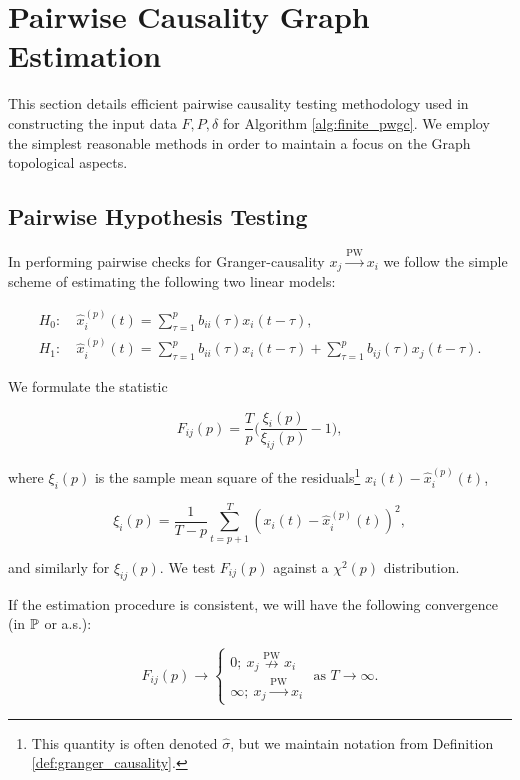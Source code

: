 \documentclass[12pt]{article}
\def\pwgc{\overset{\text{PW}}{\rightarrow}}  %
\def\npwgc{\overset{\text{PW}}{\nrightarrow}}  %
\begin{document}
\clearpage
\printbibliography
\clearpage
\appendix

\section{Pairwise Causality Graph Estimation}
This section details efficient pairwise causality testing methodology
used in constructing the input data $F, P, \delta$ for Algorithm
\ref{alg:finite_pwgc}.  We employ the simplest reasonable methods in
order to maintain a focus on the Graph topological aspects.

\subsection{Pairwise Hypothesis Testing}
\label{sec:pairwise_hypothesis_testing}
In performing pairwise checks for Granger-causality $x_j \pwgc x_i$ we
follow the simple scheme of estimating the following two linear models:

\begin{align}
  H_0:&\ \widehat{x}_i^{(p)}(t) = \sum_{\tau = 1}^{p} b_{ii}(\tau)x_i(t - \tau),\\
  H_1:&\ \widehat{x}_i^{(p)}(t) = \sum_{\tau = 1}^{p} b_{ii}(\tau)x_i(t - \tau) + \sum_{\tau = 1}^pb_{ij}(\tau)x_j(t - \tau).
\end{align}

We formulate the statistic 

\begin{equation}
  \label{eqn:gc_statistics}
  F_{ij}(p) = \frac{T}{p}\Big(\frac{\xi_i(p)}{\xi_{ij}(p)} - 1\Big),
\end{equation}

where $\xi_i(p)$ is the sample mean square of the
residuals\footnote{This quantity is often denoted $\widehat{\sigma}$,
  but we maintain notation from Definition
  \ref{def:granger_causality}.}  $x_i(t) - \widehat{x}^{(p)}_i(t)$,

\begin{equation*}
  \xi_i(p) = \frac{1}{T - p}\sum_{t = p + 1}^T (x_i(t) - \widehat{x}_i^{(p)}(t))^2,
\end{equation*}

and similarly for $\xi_{ij}(p)$.  We test $F_{ij}(p)$ against a
$\chi^2(p)$ distribution.

If the estimation procedure is consistent, we will have the following
convergence (in $\P$ or a.s.):

\begin{equation}
  F_{ij}(p) \rightarrow
  \left\{
    \begin{array}{ll}
      0;\ x_j \npwgc x_i\\
      \infty;\ x_j \pwgc x_i
    \end{array}
  \right. \text{ as } T \rightarrow \infty.  %
\end{equation}
\end{document}
